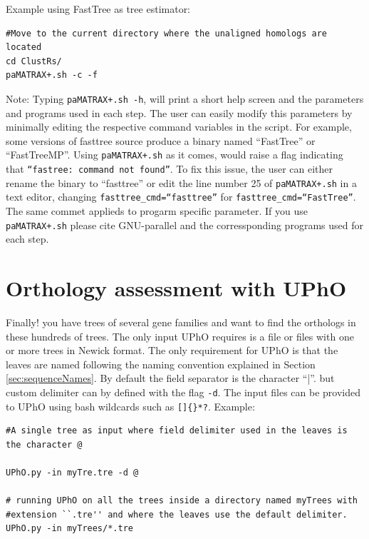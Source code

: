 \documentclass[10pt]{article}
\begin{document}
Example using FastTree as tree estimator:

\begin{lstlisting} 
#Move to the current directory where the unaligned homologs are located 
cd ClustRs/ 
paMATRAX+.sh -c -f

\end{lstlisting}

Note: Typing \texttt{paMATRAX+.sh -h}, will print a short help screen
and the parameters and programs used in each step. The user can easily
modify this parameters by minimally editing the respective command
variables in the script. For example, some versions of fasttree source
produce a binary named ``FastTree'' or ``FastTreeMP''. Using
\texttt{paMATRAX+.sh} as it comes, would raise a flag indicating that
\texttt{``fastree: command not found''}. To fix this issue, the user can either rename
the binary to ``fasttree'' or edit the line number 25 of
\texttt{paMATRAX+.sh} in a text editor, changing
\texttt{fasttree\_cmd=``fasttree''} for
\texttt{fasttree\_cmd=``FastTree''}. The same commet applieds to
progarm specific parameter. If you use \texttt{paMATRAX+.sh} please
cite GNU-parallel and the corressponding programs used for each step.

\section{Orthology assessment with UPhO} Finally! you have trees of
several gene families and want to find the orthologs in these hundreds
of trees. The only input UPhO requires is a file or files with one or
more trees in Newick format. The only requirement for UPhO is that the leaves
are named following the naming convention explained in Section
\ref{sec:sequenceNames}. By default the field separator is the
character ``|''.  but custom delimiter can by defined with the flag \texttt{-d}. The
input files can be provided to UPhO using bash wildcards such as
\texttt{[]\{\}*?}. Example:

\begin{lstlisting} 
#A single tree as input where field delimiter used in the leaves is the character @ 

UPhO.py -in myTre.tre -d @

# running UPhO on all the trees inside a directory named myTrees with
#extension ``.tre'' and where the leaves use the default delimiter.
UPhO.py -in myTrees/*.tre

\end{lstlisting}
\end{document}
